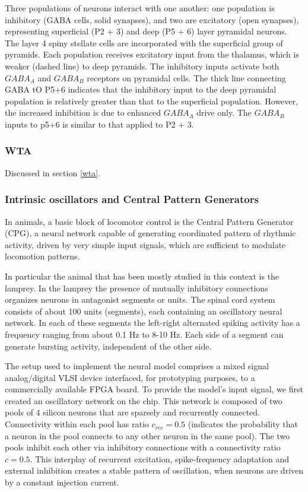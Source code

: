 \documentclass[main]{subfiles}
\begin{document}
Three populations of neurons interact with one another: one population is inhibitory (GABA cells, solid synapses), and two are excitatory (open synapses), representing superficial (P2 + 3) and deep (P5 + 6) layer pyramidal neurons. The layer 4 spiny stellate cells are incorporated with the superficial group of pyramids. Each population receives excitatory input from the thalamus, which is weaker (dashed line) to deep pyramids. The inhibitory inputs activate both $GABA_A$ and $GABA_B$ receptors on pyramidal cells. The thick line connecting GABA tO P5+6 indicates that the inhibitory input to the deep pyramidal population is relatively greater than that to the superficial population. However, the increased inhibition is due to enhanced $GABA_A$ drive only. The $GABA_B$ inputs to p5+6 is similar to that applied to P2 + 3.

\subsubsection{WTA}
Discussed in section \ref{wta}.
\subsubsection{Intrinsic oscillators and Central Pattern Generators}
In animals, a basic block of locomotor control is the Central Pattern Generator (CPG), a neural network capable of generating coordinated pattern of rhythmic activity, driven by very simple input signals, which are sufficient to modulate locomotion patterns.  

In particular the animal that has been mostly studied in this context is the lamprey. In the lamprey the presence of mutually inhibitory connections organizes neurons in antagonist segments or units. The spinal cord system consists of about 100 units (segments), each containing an oscillatory neural network. In each of these segments the left-right alternated spiking activity has a frequency ranging from about 0.1 Hz to 8-10 Hz. Each side of a segment can generate bursting activity, independent of the other side. 

The setup used to implement the neural model comprises a mixed signal analog/digital VLSI device interfaced, for prototyping purposes, to a commercially available FPGA board. To provide the model’s input signal, we first created an oscillatory network on the chip. This network is composed of two pools of 4 silicon neurons that are sparsely and recurrently connected. Connectivity within each pool has ratio $c_{rec}=0.5$ (indicates the probability that a neuron in the pool connects to any other neuron in the same pool). The two pools inhibit each other via inhibitory connections with a connectivity ratio $c=0.5$. This interplay of recurrent excitation, spike-frequency adaptation and external inhibition creates a stable pattern of oscillation, when neurons are driven by a constant injection current.   
\end{document}
